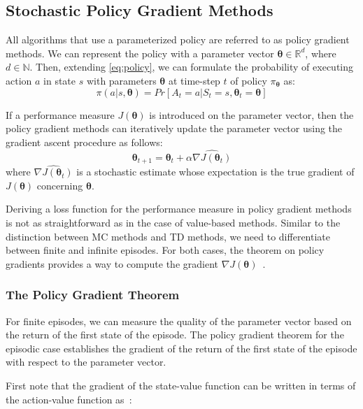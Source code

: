 \documentclass[../xlapes02]{subfiles}
\begin{document}
    \subsection{Stochastic Policy Gradient Methods}\label{subsec:policy-gradient}
    All algorithms that use a parameterized policy are referred to as policy gradient methods. We can represent the policy with a parameter vector $ \bm{\theta} \in \mathbb{R}^d $, where $ d \in \mathbb{N} $. Then, extending \cref{eq:policy}, we can formulate the probability of executing action $ a $ in state $ s $ with parameters $ \bm{\theta} $ at time-step $ t $ of policy $ \pi_{\bm{\theta}} $ as:
    \begin{equation}
        \pi(a|s,\bm{\theta})=Pr\left[A_t=a|S_t=s,\bm{\theta}_t=\bm{\theta}\right]
    \end{equation}

    If a performance measure $ J(\bm{\theta}) $ is introduced on the parameter vector, then the policy gradient methods can iteratively update the parameter vector using the gradient ascent procedure as follows:
    \begin{equation}
        \bm{\theta}_{t+1}=\bm{\theta}_t+\alpha\widehat{\nabla J(\bm{\theta}_t)}
    \end{equation}
    where $\widehat{\nabla J(\bm{\theta}_t)}$ is a stochastic estimate whose expectation is the true gradient of $ J(\bm{\theta}) $ concerning $ \bm{\theta} $.

    Deriving a loss function for the performance measure in policy gradient methods is not as straightforward as in the case of value-based methods. Similar to the distinction between MC methods and TD methods, we need to differentiate between finite and infinite episodes. For both cases, the theorem on policy gradients provides a way to compute the gradient $ \nabla J(\bm{\theta}) $~\cite{sutton2018reinforcement, FITMT25127}.

    \subsubsection{The Policy Gradient Theorem}\label{subsubsec:policy-gradient-theorem}
    For finite episodes, we can measure the quality of the parameter vector based on the return of the first state of the episode. The policy gradient theorem for the episodic case establishes the gradient of the return of the first state of the episode with respect to the parameter vector.

    First note that the gradient of the state-value function can be
    written in terms of the action-value function as~\cite{sutton2018reinforcement}:
\end{document}
